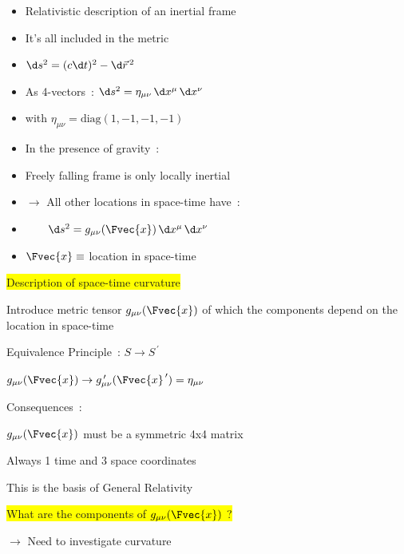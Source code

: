 \Tr
{}%
\begin{itemize}
\item Relativistic description of an {\red inertial frame}
\item[] It's all included in the metric
\item[] $\d s^{2}=(c\d t)^{2}-\d\vec{r}^{\,2}$
\item[] As 4-vectors~: {\red $\d s^{2}=\eta_{\mu\nu}\,\d x^{\mu}\,\d x^{\nu}$}
\item[] with $\eta_{\mu\nu}=\text{diag}(1,-1,-1,-1)$
\item In the presence of gravity~:
\item[] Freely falling frame is only locally inertial
\item[] $\rightarrow$ All other locations in space-time have~:
\item[] {\blue $\qquad \d s^{2}=g_{\mu\nu}(\Fvec{x})\,\d x^{\mu}\,\d x^{\nu}$}
\item[] $\Fvec{x} \equiv$ location in space-time
\end{itemize}

\newpage

\begin{itemize}
\item[] \begin{center}\colorbox{yellow}{Description of space-time curvature}\end{center}
{\red
\item[] Introduce metric tensor $g_{\mu\nu}(\Fvec{x})$ of which the components
        depend on the location in space-time 
}
\item Equivalence Principle~: $S \rightarrow S^{\,\prime}$
\item[] $g_{\mu\nu}(\Fvec{x}) \rightarrow g_{\mu\nu}^{\,\prime}(\Fvec{x}^{\,\prime})=\eta_{\mu\nu}$
\item Consequences~:
{\blue
\item[] $g_{\mu\nu}(\Fvec{x})$ must be a symmetric 4x4 matrix
\item[] Always 1 time and 3 space coordinates
}
\item[$\ast$] This is the basis of {\red General Relativity}
\item[] \colorbox{yellow}{What are the components of $g_{\mu\nu}(\Fvec{x})$ ?}
\item[] $\rightarrow$ Need to investigate curvature
\end{itemize}